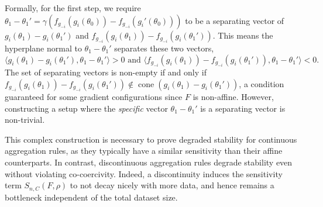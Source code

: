 \documentclass[twoside,11pt]{article}
\let\todo\relax%
\newcommand{\comm}[3][inline]{\todo[#1, size=\tiny]{#2: #3}}
\newcommand{\tbtodo}[2][inline]{\comm[color=orange,#1]{TB}{#2}}
\begin{document}
Formally, for the first step, we require $\theta_1 - \theta_1' = \gamma ( f_{g_{-i}}(g_i(\theta_0)) - f_{g_{-i}}(g_i'(\theta_0)) )$ to be a separating vector of $g_i(\theta_1) - g_i(\theta_1')$ and $f_{g_{-i}}(g_i(\theta_1)) - f_{g_{-i}}(g_i(\theta_1'))$. 
This means the hyperplane normal to $\theta_1 - \theta_1'$ separates these two vectors, 
\[
    \textstyle \langle g_i(\theta_1) - g_i(\theta_1'), \theta_1 - \theta_1' \rangle > 0 \text{ and } \langle f_{g_{-i}}(g_i(\theta_1)) - f_{g_{-i}}(g_i(\theta_1')), \theta_1 - \theta_1' \rangle < 0. 
\]
The set of separating vectors is non-empty if and only if $f_{g_{-i}}(g_i(\theta_1))-f_{g_{-i}}(g_i(\theta_1')) \not\in \operatorname{cone}(g_i(\theta_1)- g_i(\theta_1'))$, a condition guaranteed for some gradient configurations since $F$ is non-affine. 
However, constructing a setup where the \textit{specific} vector $\theta_1-\theta_1'$ is a separating vector is non-trivial. %

This complex construction is necessary to prove degraded stability for continuous aggregation rules, as they typically have a similar sensitivity than their affine counterparts.
In contrast, discontinuous aggregation rules degrade stability even without violating co-coercivity. 
Indeed, a discontinuity induces the sensitivity term $S_{n, C}(F, \rho)$ to not decay nicely with more data, and hence remains a bottleneck independent of the total dataset size.
\end{document}
